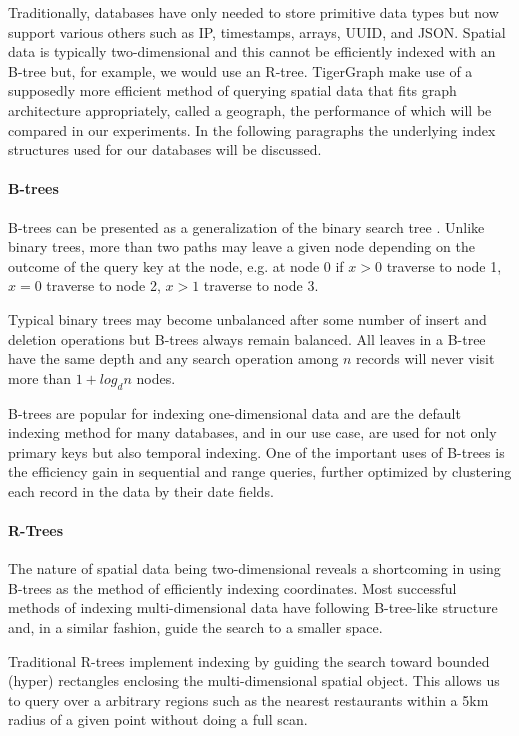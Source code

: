 Traditionally, databases have only needed to store primitive data types but now support various others such as IP, timestamps, arrays, UUID, and JSON. Spatial data is typically two-dimensional and this cannot be efficiently indexed with an B-tree but, for example, we would use an R-tree. TigerGraph make use of a supposedly more efficient method of querying spatial data that fits graph architecture appropriately, called a geograph, the performance of which will be compared in our experiments. In the following paragraphs the underlying index structures used for our databases will be discussed.

\paragraph{B-trees}
B-trees can be presented as a generalization of the binary search tree \cite{btree}. Unlike binary trees, more than two paths may leave a given node depending on the outcome of the query key at the node, e.g. at node 0 if $x>0$ traverse to node 1, $x=0$ traverse to node 2, $x>1$ traverse to node 3.

Typical binary trees may become unbalanced after some number of insert and deletion operations but B-trees always remain balanced. All leaves in a B-tree have the same depth and any search operation among $n$ records will never visit more than $1 + log_dn$ nodes.

B-trees are popular for indexing one-dimensional data and are the default indexing method for many databases, and in our use case, are used for not only primary keys but also temporal indexing. One of the important uses of B-trees is the efficiency gain in sequential and range queries, further optimized by clustering each record in the data by their date fields.

\paragraph{R-Trees}

The nature of spatial data being two-dimensional reveals a shortcoming in using B-trees as the method of efficiently indexing coordinates. Most successful methods of indexing multi-dimensional data have following B-tree-like structure \cite{rtree} and, in a similar fashion, guide the search to a smaller space.

Traditional R-trees implement indexing by guiding the search toward bounded (hyper) rectangles enclosing the multi-dimensional spatial object. This allows us to query over a arbitrary regions such as the nearest restaurants within a 5km radius of a given point without doing a full scan.

